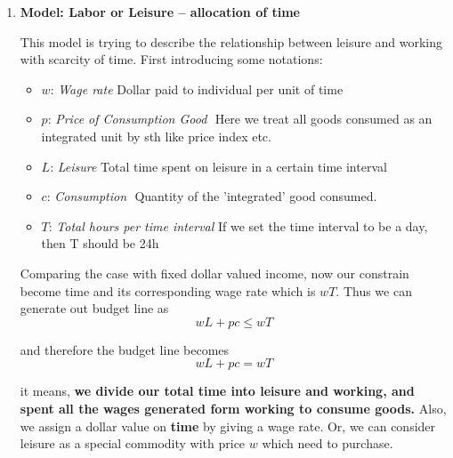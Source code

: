 \documentclass[10pt]{article}
\newenvironment{changemargin}[2]{%
  \begin{list}{}{%
    \setlength{\topsep}{0pt}%
    \setlength{\leftmargin}{#1}%
    \setlength{\rightmargin}{#2}%
    \setlength{\listparindent}{\parindent}%
    \setlength{\itemindent}{\parindent}%
    \setlength{\parsep}{\parskip}%
  }%
  \item[]}{\end{list}}
\begin{document}
\begin{changemargin}{-0.125in}{0in}
\begin{enumerate}
\begin{enumerate}
                        \bigskip
                        
                        \item \textbf{Model: Labor or Leisure -- allocation of time}
                        
                        \smallskip
                        
                        This model is trying to describe the relationship between leisure and working with scarcity of time. First introducing some notations: 
                        
                        \smallskip
                        
                        \begin{itemize}
                        	\item $w$: \textit{Wage rate} $    $Dollar paid to individual per unit of time
                        	\item $p$: \textit{Price of Consumption Good} $    $ Here we treat all goods consumed as an integrated unit by sth like price index etc. 
                        	\item $L$: \textit{Leisure}$    $ Total time spent on leisure in a certain time interval
                        	\item $c$: \textit{Consumption} $    $ Quantity of the 'integrated' good consumed.  
                        	\item $T$: \textit{Total hours per time interval} If we set the time interval to be a day, then T should be 24h
                        \end{itemize}
                        
                        \smallskip
                        
                        Comparing the case with fixed dollar valued income, now our constrain become time and its corresponding wage rate which is $wT$. Thus we can generate out budget line as 
                        \[
                        wL + pc \leq wT
                        \]
                        
                        and therefore the budget line becomes 
                        \[
                        wL + pc = wT
                        \]
                        
                        it means, \textbf{we divide our total time into leisure and working, and spent all the wages generated form working to consume goods.} Also, we assign a dollar value on \textbf{time} by giving a wage rate. Or, we can consider leisure as a special commodity with price $w$ which need to purchase.\\
                        

\end{enumerate}
\end{enumerate}
\end{changemargin}
\end{document}
